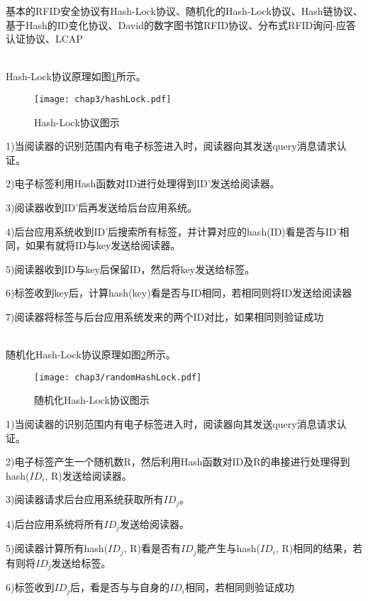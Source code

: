 基本的RFID安全协议有Hash-Lock协议、随机化的Hash-Lock协议、Hash链协议、基于Hash的ID变化协议、David的数字图书馆RFID协议、分布式RFID询问-应答认证协议、LCAP

\\

Hash-Lock协议原理如图\ref{fig:Hash-Lock协议图示}所示。

\begin{figure}[!htp]
	\centering
	\texttt{[image: chap3/hashLock.pdf]}
	\caption{Hash-Lock协议图示}\label{fig:Hash-Lock协议图示}
\end{figure}

1)当阅读器的识别范围内有电子标签进入时，阅读器向其发送query消息请求认证。

2)电子标签利用Hash函数对ID进行处理得到ID'发送给阅读器。

3)阅读器收到ID'后再发送给后台应用系统。

4)后台应用系统收到ID'后搜索所有标签，并计算对应的hash(ID)看是否与ID'相同，如果有就将ID与key发送给阅读器。

5)阅读器收到ID与key后保留ID，然后将key发送给标签。

6)标签收到key后，计算hash(key)看是否与ID相同，若相同则将ID发送给阅读器

7)阅读器将标签与后台应用系统发来的两个ID对比，如果相同则验证成功

\\

随机化Hash-Lock协议原理如图\ref{fig:随机化Hash-Lock协议图示}所示。

\begin{figure}[!htp]
	\centering
	\texttt{[image: chap3/randomHashLock.pdf]}
	\caption{随机化Hash-Lock协议图示}\label{fig:随机化Hash-Lock协议图示}
\end{figure}

1)当阅读器的识别范围内有电子标签进入时，阅读器向其发送query消息请求认证。

2)电子标签产生一个随机数R，然后利用Hash函数对ID及R的串接进行处理得到hash($ID_{i}$, R)发送给阅读器。

3)阅读器请求后台应用系统获取所有$ID_{j}$。

4)后台应用系统将所有$ID_{j}$发送给阅读器。

5)阅读器计算所有hash($ID_{j}$, R)看是否有$ID_{j}$能产生与hash($ID_{i}$, R)相同的结果，若有则将$ID_{j}$发送给标签。

6)标签收到$ID_{j}$后，看是否与与自身的$ID_{i}$相同，若相同则验证成功

\\


